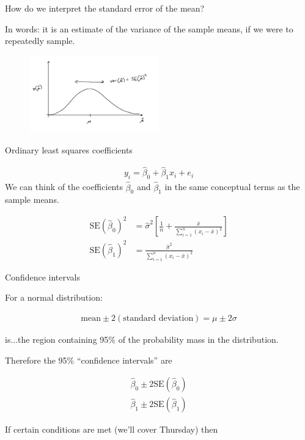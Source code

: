\documentclass[aspectratio=169]{beamer}
\begin{document}
\begin{frame}{How do we interpret the standard error of the mean?}

In words: it is an estimate of the variance of the sample means, if we were to repeatedly sample.

\pause
\begin{figure}
\includegraphics[width=0.5\textwidth]{sample_mean_dist}
\end{figure}
\end{frame}


\begin{frame}{Ordinary least squares coefficients}

\begin{align*}
y_i=\hat{\beta}_0+\hat{\beta}_1x_i+e_i
\end{align*}
We can think of the coefficients $\hat{\beta}_0$ and $\hat{\beta}_1$ in the same conceptual terms as the sample means.

\begin{align*}
\text{SE}(\hat{\beta}_0)^2 &= \hat{\sigma}^2 \left[ \frac{1}{n} +
\frac{\bar{x}}{\sum_{i=1}^n (x_i-\bar{x})^2} \right]\\
\text{SE}(\hat{\beta}_1)^2& = \frac{\hat{\sigma}^2}{\sum_{i=1}^n (x_i-\bar{x})^2}
\end{align*}

\end{frame}

\begin{frame}{Confidence intervals}

For a normal distribution:

\begin{align*}
\text{mean} \pm 2 (\text{standard deviation}) = \mu \pm 2\sigma
\end{align*}

is...\pause the region containing 95\% of the probability mass in the distribution.  

\vspace{5mm}

Therefore the 95\% ``confidence intervals'' are

\begin{align*}
\hat{\beta}_0 \pm 2\text{SE}(\hat{\beta}_0) \\
\hat{\beta}_1 \pm 2\text{SE}(\hat{\beta}_1) 
\end{align*}

If certain conditions are met (we'll cover Thursday) then
\end{frame}
\end{document}
